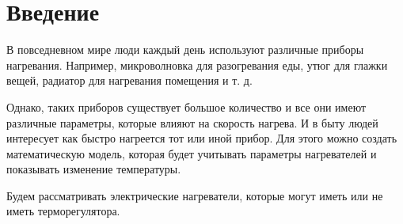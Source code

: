 \section{Введение}
    В повседневном мире люди каждый день используют различные приборы нагревания. Например, микроволновка для разогревания еды, утюг для глажки вещей, радиатор для нагревания помещения и т. д.
    
    Однако, таких приборов существует большое количество и все они имеют различные параметры, которые влияют на скорость нагрева. И в быту людей интересует как быстро нагреется тот или иной прибор. Для этого можно создать математическую модель, которая будет учитывать параметры нагревателей и показывать изменение температуры.

    Будем рассматривать электрические нагреватели, которые могут иметь или не иметь терморегулятора.